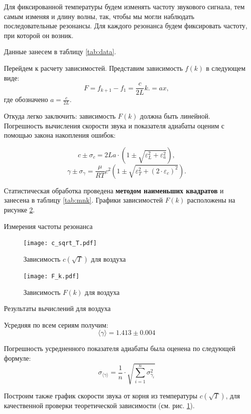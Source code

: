 \documentclass[12pt,a4paper]{article}
\begin{document}
Для фиксированной температуры будем изменять частоту звукового сигнала, тем самым изменяя и длину волны, так, чтобы мы могли наблюдать последовательные резонансы. Для каждого резонанса будем фиксировать частоту, при которой он возник. 

Данные занесем в таблицу \ref{tab:data}.

Перейдем к расчету зависимостей. Представим зависимость $f(k)$ в следующем виде:
$$F = f_{k+1} - f_1= \frac{c}{2L}k. = ax,$$
где обозначено $a = \frac{c}{2L}$.

Откуда легко заключить: зависимость $F(k)$ должна быть линейной.
Погрешность вычисления скорости звука и показателя адиабаты оценим с помощью закона накопления ошибок:


$$c \pm \sigma_c = 2La \cdot \left(1 \pm \sqrt{\varepsilon_L^2 + \varepsilon_a^2}\right),$$
$$\gamma \pm \sigma_\gamma=\frac{\mu}{RT} c^2 \left(1 \pm \sqrt{\varepsilon_T^2 + \left(2\cdot\varepsilon_c\right)^2}\right).$$


Статистическая обработка проведена \textbf{методом наименьших квадратов} и занесена в таблицу \ref{tab:mnk}.
Графики зависимостей $F(k)$ расположены на рисунке \ref{fig:fk}.

\begin{table}[H]
	\caption{Измерения частоты резонанса}
	\label{tab:data}
	
\end{table}

\begin{figure}[H]
	\texttt{[image: c\_sqrt\_T.pdf]}
	\caption{Зависимость $c(\sqrt{T})$ для воздуха}
	\label{fig:ct}
\end{figure}

		
\begin{figure}[H]
	\texttt{[image: F\_k.pdf]}
	\caption{Зависимость $F(k)$ для воздуха}
	\label{fig:fk}
\end{figure}

\begin{table}[H]
	\caption{Результаты вычислений для воздуха}
	\label{tab:mnk}
	
\end{table}



Усредняя по всем сериям получим:
$$	\langle\gamma\rangle = 1.413 \pm 0.004$$

Погрешность усредненного показателя адиабаты была оценена по следующей формуле:
$$\sigma_{\langle\gamma\rangle} = \frac{1}{n} \cdot \sqrt{\sum_{i = 1}^{n} \sigma_{\gamma_i}^2}$$

Построим также график скорости звука от корня из температуры $c(\sqrt{T})$, для качественной проверки теоретической зависимости (см. рис. \ref{fig:ct}).
\end{document}
